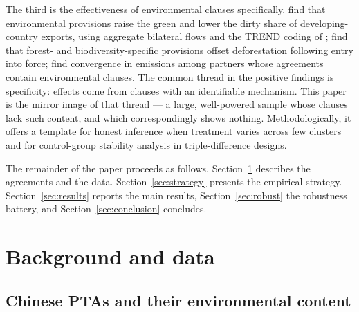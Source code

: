 \documentclass[12pt]{article}
\begin{document}
The third is the effectiveness of environmental clauses specifically.
\citet{brandi2020} find that environmental provisions raise the green and lower the dirty
share of developing-country exports, using aggregate bilateral flows and the TREND coding
of \citet{morin2018}; \citet{abman2024} find that forest- and biodiversity-specific
provisions offset deforestation following entry into force; \citet{baghdadi2013} find
convergence in emissions among partners whose agreements contain environmental clauses.
The common thread in the positive findings is specificity: effects come from clauses with
an identifiable mechanism. This paper is the mirror image of that thread --- a large,
well-powered sample whose clauses lack such content, and which correspondingly shows
nothing.
Methodologically, it offers a template for honest inference when treatment varies across
few clusters \citep{cameron2008, abadie2023, mackinnon2017} and for control-group
stability analysis in triple-difference designs.

The remainder of the paper proceeds as follows. Section~\ref{sec:background} describes
the agreements and the data. Section~\ref{sec:strategy} presents the empirical strategy.
Section~\ref{sec:results} reports the main results, Section~\ref{sec:robust} the
robustness battery, and Section~\ref{sec:conclusion} concludes.

\section{Background and data}\label{sec:background}

\subsection{Chinese PTAs and their environmental content}
\end{document}
